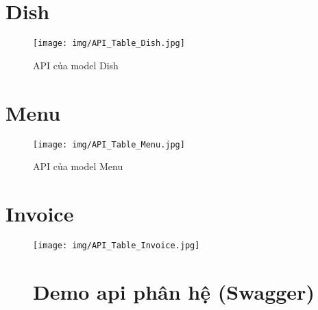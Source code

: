 \documentclass{report}
\begin{document}
\section{Dish}

\begin{figure}[H]
    \begin{center}
    	\texttt{[image: img/API\_Table\_Dish.jpg]}
    	\linebreak
    	\caption{API của model Dish}
    \end{center}
\end{figure}

\section{Menu}

\begin{figure}[H]
    \begin{center}
    	\texttt{[image: img/API\_Table\_Menu.jpg]}
    	\linebreak
    	\caption{API của model Menu}
    \end{center}
\end{figure}

\section{Invoice}

\begin{figure}[H]
    \begin{center}
    	\texttt{[image: img/API\_Table\_Invoice.jpg]}
    	\linebreak
    \end{center}
\section{Demo api phân hệ (Swagger)}
\fontsize{15}{15}\selectfont
\paragraph{}
\end{figure}
\end{document}
